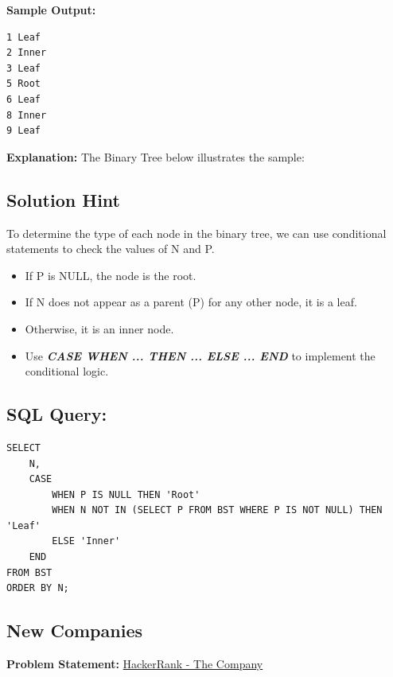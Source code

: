 \documentclass[12pt,a4paper]{article}
\begin{document}
\textbf{Sample Output:}
\begin{verbatim}
1 Leaf
2 Inner
3 Leaf
5 Root
6 Leaf
8 Inner
9 Leaf
\end{verbatim}
\textbf{Explanation:}
The Binary Tree below illustrates the sample:
\begin{center}
\end{center}
\subsection*{Solution Hint}
To determine the type of each node in the binary tree, we can use conditional statements to check the values of N and P.
\begin{itemize}
    \item If P is NULL, the node is the root.
    \item If N does not appear as a parent (P) for any other node, it is a leaf.
    \item Otherwise, it is an inner node.
    \item Use \textit{\textbf{CASE WHEN ... THEN ... ELSE ... END}} to implement the conditional logic.
\end{itemize}
\subsection*{SQL Query: }
\begin{lstlisting}[style=sqlstyle]
SELECT
    N,
    CASE
        WHEN P IS NULL THEN 'Root'
        WHEN N NOT IN (SELECT P FROM BST WHERE P IS NOT NULL) THEN 'Leaf'
        ELSE 'Inner'
    END
FROM BST
ORDER BY N;
\end{lstlisting}
\subsection{New Companies}
\textbf{Problem Statement:}
\href{https://www.hackerrank.com/challenges/the-company/problem?isFullScreen=true}{HackerRank - The Company}
\end{document}

